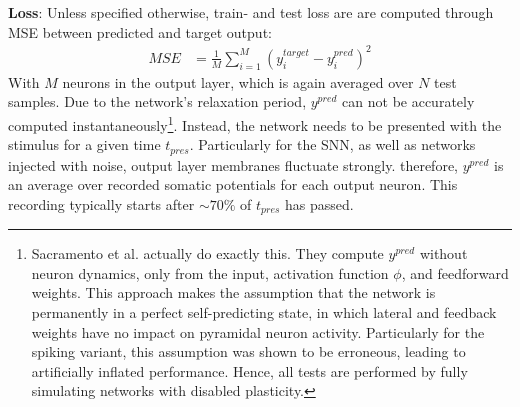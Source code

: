 \textbf{Loss}: Unless specified otherwise, train- and test loss are are computed through MSE between predicted and
target output:
\begin{align*}
  MSE & = \frac{1}{M} \sum_{i=1}^M \left( y^{target}_i-y^{pred}_i \right)^2
\end{align*}
With $M$ neurons in the output layer, which is again averaged over $N$ test samples. Due to the network's relaxation
period, $y^{pred}$ can not be accurately computed instantaneously\footnote{Sacramento et al. actually do exactly this.
They compute $y^{pred}$ without neuron dynamics, only from the input, activation function $\phi$, and feedforward
weights. This approach makes the assumption that the network is permanently in a perfect self-predicting state, in which
lateral and feedback weights have no impact on pyramidal neuron activity. Particularly for the spiking variant, this
assumption was shown to be erroneous, leading to artificially inflated performance. Hence, all tests are performed by
fully simulating networks with disabled plasticity.}. Instead, the network needs to be presented with the stimulus for a
given time $t_{pres}$. Particularly for the SNN, as well as networks injected with noise, output layer membranes
fluctuate strongly. therefore, $y^{pred}$ is an average over recorded somatic potentials for each output neuron. This
recording typically starts after $\sim 70\%$ of $t_{pres}$ has passed.